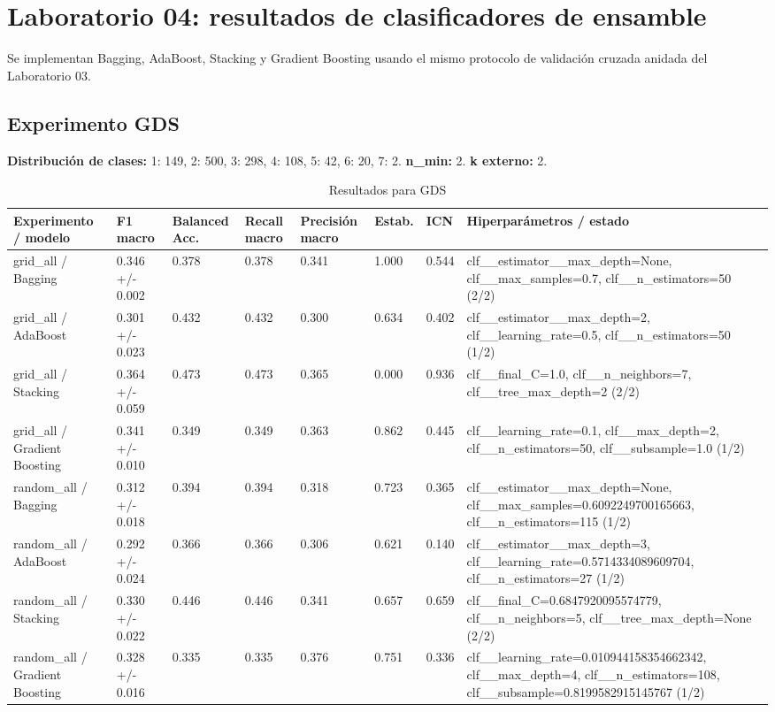 \documentclass{article}
\begin{document}
\section*{Laboratorio 04: resultados de clasificadores de ensamble}
Se implementan Bagging, AdaBoost, Stacking y Gradient Boosting usando el mismo protocolo de validaci\'on cruzada anidada del Laboratorio 03.

\subsection*{Experimento GDS}
\noindent\textbf{Distribuci\'on de clases:} 1: 149, 2: 500, 3: 298, 4: 108, 5: 42, 6: 20, 7: 2. \textbf{n\_min:} 2. \textbf{k externo:} 2.
\begin{table}[h]
\centering
\caption{Resultados para GDS}
\scriptsize
\begin{tabular}{p{3.2cm}p{2.0cm}p{1.6cm}p{1.6cm}p{1.8cm}p{1.5cm}p{1.4cm}p{3.4cm}}
\toprule
Experimento / modelo & F1 macro & Balanced Acc. & Recall macro & Precisi\'on macro & Estab. & ICN & Hiperpar\'ametros / estado \\
\midrule
grid\_all / Bagging & 0.346 +/- 0.002 & 0.378 & 0.378 & 0.341 & 1.000 & 0.544 & clf\_\_estimator\_\_max\_depth=None, clf\_\_max\_samples=0.7, clf\_\_n\_estimators=50 (2/2) \\
grid\_all / AdaBoost & 0.301 +/- 0.023 & 0.432 & 0.432 & 0.300 & 0.634 & 0.402 & clf\_\_estimator\_\_max\_depth=2, clf\_\_learning\_rate=0.5, clf\_\_n\_estimators=50 (1/2) \\
grid\_all / Stacking & 0.364 +/- 0.059 & 0.473 & 0.473 & 0.365 & 0.000 & 0.936 & clf\_\_final\_C=1.0, clf\_\_n\_neighbors=7, clf\_\_tree\_max\_depth=2 (2/2) \\
grid\_all / Gradient Boosting & 0.341 +/- 0.010 & 0.349 & 0.349 & 0.363 & 0.862 & 0.445 & clf\_\_learning\_rate=0.1, clf\_\_max\_depth=2, clf\_\_n\_estimators=50, clf\_\_subsample=1.0 (1/2) \\
random\_all / Bagging & 0.312 +/- 0.018 & 0.394 & 0.394 & 0.318 & 0.723 & 0.365 & clf\_\_estimator\_\_max\_depth=None, clf\_\_max\_samples=0.6092249700165663, clf\_\_n\_estimators=115 (1/2) \\
random\_all / AdaBoost & 0.292 +/- 0.024 & 0.366 & 0.366 & 0.306 & 0.621 & 0.140 & clf\_\_estimator\_\_max\_depth=3, clf\_\_learning\_rate=0.5714334089609704, clf\_\_n\_estimators=27 (1/2) \\
random\_all / Stacking & 0.330 +/- 0.022 & 0.446 & 0.446 & 0.341 & 0.657 & 0.659 & clf\_\_final\_C=0.6847920095574779, clf\_\_n\_neighbors=5, clf\_\_tree\_max\_depth=None (2/2) \\
random\_all / Gradient Boosting & 0.328 +/- 0.016 & 0.335 & 0.335 & 0.376 & 0.751 & 0.336 & clf\_\_learning\_rate=0.010944158354662342, clf\_\_max\_depth=4, clf\_\_n\_estimators=108, clf\_\_subsample=0.8199582915145767 (1/2) \\
\bottomrule
\end{tabular}
\end{table}
\end{document}
